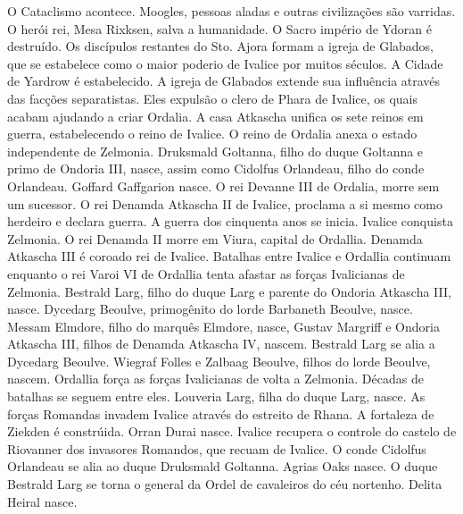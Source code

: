 %
 O Cataclismo acontece. Moogles, pessoas aladas e outras civilizações são varridas. O herói rei, Mesa Rixksen, salva a humanidade. O Sacro império de Ydoran é destruído.\nlwb
%
 Os discípulos restantes do Sto. Ajora formam a igreja de Glabados, que se estabelece como o maior poderio de Ivalice por muitos séculos.\nlwb
%
 A Cidade de Yardrow é estabelecido.\nlwb
%
 A igreja de Glabados extende sua influência através das facções separatistas. Eles expulsão o clero de Phara de Ivalice, os quais acabam ajudando a criar Ordalia.\nlwb
%
 A casa Atkascha unifica os sete reinos em guerra, estabelecendo o reino de Ivalice.\nlwb
%
 O reino de Ordalia anexa o estado independente de Zelmonia. \nlwb
%
 Druksmald Goltanna, filho do duque Goltanna e primo de Ondoria III, nasce, assim como Cidolfus Orlandeau, filho do conde Orlandeau.\nlwb
%
 Goffard Gaffgarion nasce. O rei Devanne III de Ordalia, morre sem um sucessor. O rei Denamda Atkascha II de Ivalice, proclama a si mesmo como herdeiro e declara guerra. A guerra dos cinquenta anos se inicia. \nlwb
%
 Ivalice conquista Zelmonia. O rei Denamda II morre em Viura, capital de Ordallia. Denamda Atkascha III é coroado rei de Ivalice. Batalhas entre Ivalice e Ordallia continuam enquanto o rei Varoi VI de Ordallia tenta afastar as forças Ivalicianas de Zelmonia. \nlwb
%
 Bestrald Larg, filho do duque Larg e parente do Ondoria Atkascha III, nasce. Dycedarg Beoulve, primogênito do lorde Barbaneth Beoulve, nasce.\nlwb
%
 Messam Elmdore, filho do marquês Elmdore, nasce, Gustav Margriff e Ondoria Atkascha III, filhos de Denamda Atkascha IV, nascem.
%
\newpage
%
 Bestrald Larg se alia a Dycedarg Beoulve. Wiegraf Folles e Zalbaag Beoulve, filhos do lorde Beoulve, nascem. \nlwb
%
 Ordallia força as forças Ivalicianas de volta a Zelmonia. Décadas de batalhas se seguem entre eles. Louveria Larg, filha do duque Larg, nasce. \nlwb
%
 As forças Romandas invadem Ivalice através do estreito de Rhana. A fortaleza de Ziekden é constrúida. Orran Durai nasce.\nlwb
%
 Ivalice recupera o controle do castelo de Riovanner dos invasores Romandos, que recuam de Ivalice. O conde Cidolfus Orlandeau se alia ao duque Druksmald Goltanna. Agrias Oaks nasce.\nlwb
%
 O duque Bestrald Larg se torna o general da Ordel de cavaleiros do céu nortenho. Delita Heiral nasce.\nlwb
